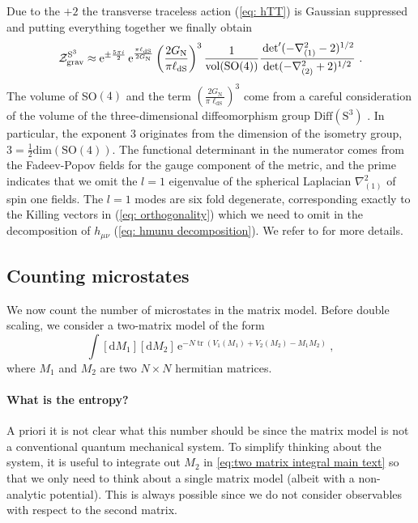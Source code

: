 \documentclass[12pt,a4paper]{article}
\DeclareMathOperator\tr{tr}
\newcommand\SO{\text{SO}}
\renewcommand\d{\text{d}}
\begin{document}
Due to the $+2$  the transverse traceless action (\ref{eq: hTT}) is Gaussian suppressed and putting everything together we finally obtain
\begin{equation}\label{eq: Zgrav S3}
    \mathcal{Z}_{\mathrm{grav}}^{\text{S}^3} \approx \mathrm{e}^{\pm \frac{5\pi i}{2}}\,\mathrm{e}^{\frac{\pi \ell_{\mathrm{dS}}}{2G_{\text{N}}}}\left(\frac{2 G_{\text{N}}}{\pi \ell_{\mathrm{dS}}}\right)^{3}\frac{1}{\mathrm{vol}(\mathrm{SO}(4))}\frac{\sideset{}{'}\det (-\nabla_{(1)}^2-2)^{1/2}}{\det(-\nabla_{(2)}^2+2)^{1/2}}~.
\end{equation}
The volume of SO$(4)$ and the term $\left(\frac{2 G_{\text{N}}}{\pi \ell_{\mathrm{dS}}}\right)^{3}$ come from a careful consideration of the volume of the three-dimensional diffeomorphism group $\text{Diff}(\mathrm{S}^3)$ \cite{Anninos:2020hfj}. In particular, the exponent 3 originates from the dimension of the isometry group, $3= \frac{1}{2}\mathrm{dim}(\SO(4))$. The functional determinant in the numerator comes from the Fadeev-Popov fields for the gauge component of the metric, and the prime indicates that we omit the $l=1$ eigenvalue of the spherical Laplacian $\nabla^2_{(1)}$ of spin one fields. The $l=1$ modes are six fold degenerate, corresponding exactly to the Killing vectors in (\ref{eq: orthogonality}) which we need to omit in the decomposition of $h_{\mu\nu}$ (\ref{eq: hmunu decomposition}).  We refer to \cite{Law:2020cpj} for more details. 








\subsection{Counting microstates} \label{subsec:microstates}
We now count the number of microstates in the matrix model.
Before double scaling, we consider a two-matrix model of the form
\begin{equation}
    \int [\d M_1][\d M_2]\, \mathrm{e}^{-N \tr(V_1(M_1) + V_2(M_2) - M_1 M_2)}~, \label{eq:two matrix integral main text}
\end{equation}
where $M_1$ and $M_2$ are two $N\times N$ hermitian matrices.
\paragraph{What is the entropy?} A priori it is not clear what this number should be since the matrix model is not a conventional quantum mechanical system. 
To simplify thinking about the system, it is useful to integrate out $M_2$ in \eqref{eq:two matrix integral main text} so that we only need to think about a single matrix model (albeit with a non-analytic potential). This is always possible since we do not consider observables with respect to the second matrix.
\end{document}

